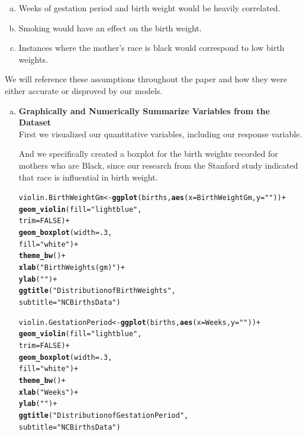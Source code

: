 \documentclass{article}\usepackage[]{graphicx}\usepackage[]{xcolor}
\makeatletter
\newcommand{\hlnum}[1]{\textcolor[rgb]{0.686,0.059,0.569}{#1}}%
\newcommand{\hlstr}[1]{\textcolor[rgb]{0.192,0.494,0.8}{#1}}%
\newcommand{\hlopt}[1]{\textcolor[rgb]{0,0,0}{#1}}%
\newcommand{\hlstd}[1]{\textcolor[rgb]{0.345,0.345,0.345}{#1}}%
\newcommand{\hlkwb}[1]{\textcolor[rgb]{0.69,0.353,0.396}{#1}}%
\newcommand{\hlkwc}[1]{\textcolor[rgb]{0.333,0.667,0.333}{#1}}%
\newcommand{\hlkwd}[1]{\textcolor[rgb]{0.737,0.353,0.396}{\textbf{#1}}}%
\newenvironment{kframe}{%
 \def\at@end@of@kframe{}%
 \ifinner\ifhmode%
  \def\at@end@of@kframe{\end{minipage}}%
  \begin{minipage}{\columnwidth}%
 \fi\fi%
 \def\FrameCommand##1{\hskip\@totalleftmargin \hskip-\fboxsep
 \colorbox{shadecolor}{##1}\hskip-\fboxsep
     \hskip-\linewidth \hskip-\@totalleftmargin \hskip\columnwidth}%
 \MakeFramed {\advance\hsize-\width
   \@totalleftmargin\z@ \linewidth\hsize
   \@setminipage}}%
 {\par\unskip\endMakeFramed%
 \at@end@of@kframe}
\newenvironment{knitrout}{}{} %
\makeatother
\begin{document}
\begin{enumerate}[a.]
\item Weeks of gestation period and birth weight would be heavily correlated.
\item Smoking would have an effect on the birth weight. 
\item Instances where the mother's race is black would correspond to low birth weights. 
\end{enumerate} 

We will reference these assumptions throughout the paper and how they were either accurate or disproved by our models. \\

\begin{enumerate}[a.]

\item \textbf{Graphically and Numerically Summarize Variables from the Dataset} \\

First we visualized our quantitative variables, including our response variable. 

And we specifically created a boxplot for the birth weights recorded for mothers who are Black, since our research from the Stanford study indicated that race is influential in birth weight.

\begin{knitrout}
\color{fgcolor}\begin{kframe}
\begin{alltt}
\hlstd{violin.BirthWeightGm} \hlkwb{<-} \hlkwd{ggplot}\hlstd{(births,} \hlkwd{aes}\hlstd{(}\hlkwc{x}\hlstd{=BirthWeightGm,} \hlkwc{y}\hlstd{=}\hlstr{""}\hlstd{))}\hlopt{+}
  \hlkwd{geom_violin}\hlstd{(}\hlkwc{fill} \hlstd{=} \hlstr{"lightblue"}\hlstd{,}
              \hlkwc{trim} \hlstd{=} \hlnum{FALSE}\hlstd{)}\hlopt{+}
  \hlkwd{geom_boxplot}\hlstd{(}\hlkwc{width} \hlstd{=} \hlnum{.3}\hlstd{,}
               \hlkwc{fill} \hlstd{=} \hlstr{"white"}\hlstd{)} \hlopt{+}
  \hlkwd{theme_bw}\hlstd{()}\hlopt{+}
  \hlkwd{xlab}\hlstd{(}\hlstr{"Birth Weights(gm)"}\hlstd{)}\hlopt{+}
  \hlkwd{ylab}\hlstd{(}\hlstr{" "}\hlstd{)}\hlopt{+}
  \hlkwd{ggtitle}\hlstd{(}\hlstr{"Distribution of Birth Weights"}\hlstd{,}
          \hlkwc{subtitle} \hlstd{=} \hlstr{"NCBirths Data"}\hlstd{)}


\hlstd{violin.GestationPeriod} \hlkwb{<-} \hlkwd{ggplot}\hlstd{(births,} \hlkwd{aes}\hlstd{(}\hlkwc{x}\hlstd{=Weeks,} \hlkwc{y}\hlstd{=}\hlstr{""}\hlstd{))}\hlopt{+}
  \hlkwd{geom_violin}\hlstd{(}\hlkwc{fill} \hlstd{=} \hlstr{"lightblue"}\hlstd{,}
              \hlkwc{trim} \hlstd{=} \hlnum{FALSE}\hlstd{)}\hlopt{+}
  \hlkwd{geom_boxplot}\hlstd{(}\hlkwc{width} \hlstd{=} \hlnum{.3}\hlstd{,}
               \hlkwc{fill} \hlstd{=} \hlstr{"white"}\hlstd{)} \hlopt{+}
  \hlkwd{theme_bw}\hlstd{()}\hlopt{+}
  \hlkwd{xlab}\hlstd{(}\hlstr{"Weeks"}\hlstd{)}\hlopt{+}
  \hlkwd{ylab}\hlstd{(}\hlstr{" "}\hlstd{)}\hlopt{+}
  \hlkwd{ggtitle}\hlstd{(}\hlstr{"Distribution of Gestation Period"}\hlstd{,}
          \hlkwc{subtitle} \hlstd{=} \hlstr{"NCBirths Data"}\hlstd{)}



\end{alltt}
\end{kframe}
\end{knitrout}
\end{enumerate}
\end{document}
